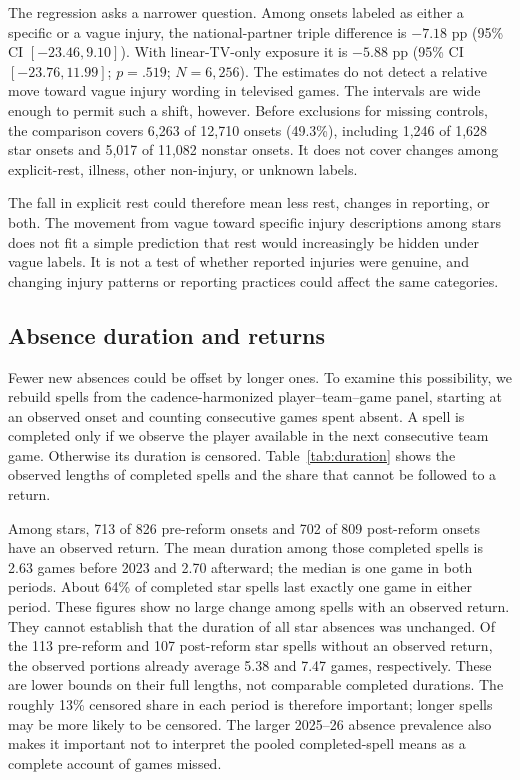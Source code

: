 \documentclass[11pt]{article}
\begin{document}
The regression asks a narrower question. Among onsets labeled as either a specific or a vague injury, the national-partner triple difference is $-7.18$ pp (95\% CI $[-23.46,9.10]$). With linear-TV-only exposure it is $-5.88$ pp (95\% CI $[-23.76,11.99]$; $p=.519$; $N=6{,}256$). The estimates do not detect a relative move toward vague injury wording in televised games. The intervals are wide enough to permit such a shift, however. Before exclusions for missing controls, the comparison covers 6,263 of 12,710 onsets (49.3\%), including 1,246 of 1,628 star onsets and 5,017 of 11,082 nonstar onsets. It does not cover changes among explicit-rest, illness, other non-injury, or unknown labels.

The fall in explicit rest could therefore mean less rest, changes in reporting, or both. The movement from vague toward specific injury descriptions among stars does not fit a simple prediction that rest would increasingly be hidden under vague labels. It is not a test of whether reported injuries were genuine, and changing injury patterns or reporting practices could affect the same categories.

\FloatBarrier
\subsection{Absence duration and returns}

Fewer new absences could be offset by longer ones. To examine this possibility, we rebuild spells from the cadence-harmonized player--team--game panel, starting at an observed onset and counting consecutive games spent absent. A spell is completed only if we observe the player available in the next consecutive team game. Otherwise its duration is censored. Table~\ref{tab:duration} shows the observed lengths of completed spells and the share that cannot be followed to a return.

Among stars, 713 of 826 pre-reform onsets and 702 of 809 post-reform onsets have an observed return. The mean duration among those completed spells is 2.63 games before 2023 and 2.70 afterward; the median is one game in both periods. About 64\% of completed star spells last exactly one game in either period. These figures show no large change among spells with an observed return. They cannot establish that the duration of all star absences was unchanged. Of the 113 pre-reform and 107 post-reform star spells without an observed return, the observed portions already average 5.38 and 7.47 games, respectively. These are lower bounds on their full lengths, not comparable completed durations. The roughly 13\% censored share in each period is therefore important; longer spells may be more likely to be censored. The larger 2025--26 absence prevalence also makes it important not to interpret the pooled completed-spell means as a complete account of games missed.
\end{document}
